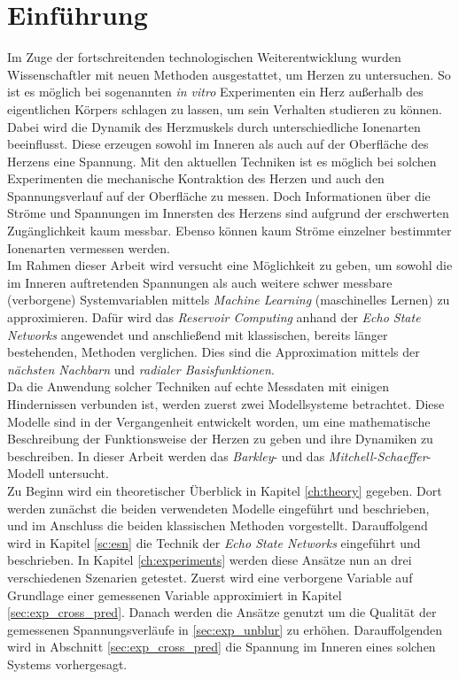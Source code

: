 \chapter{Einführung}



Im Zuge der fortschreitenden technologischen Weiterentwicklung wurden Wissenschaftler mit neuen Methoden ausgestattet, um Herzen zu untersuchen. So ist es möglich bei sogenannten \textit{in vitro} Experimenten ein Herz außerhalb des eigentlichen Körpers schlagen zu lassen, um sein Verhalten studieren zu können. Dabei wird die Dynamik des Herzmuskels durch unterschiedliche Ionenarten beeinflusst. Diese erzeugen sowohl im Inneren als auch auf der Oberfläche des Herzens eine Spannung. Mit den aktuellen Techniken ist es möglich bei solchen Experimenten die mechanische Kontraktion des Herzen und auch den Spannungsverlauf auf der Oberfläche zu messen. Doch Informationen über die Ströme und Spannungen im Innersten des Herzens sind aufgrund der erschwerten Zugänglichkeit kaum messbar. Ebenso können kaum Ströme einzelner bestimmter Ionenarten vermessen werden. \\

Im Rahmen dieser Arbeit wird versucht eine Möglichkeit zu geben, um sowohl die im Inneren auftretenden Spannungen als auch weitere schwer messbare (verborgene) Systemvariablen mittels \textit{Machine Learning} (maschinelles Lernen) zu approximieren. Dafür wird das \textit{Reservoir Computing} anhand der \textit{Echo State Networks} angewendet und anschließend mit klassischen, bereits länger bestehenden, Methoden verglichen. Dies sind die Approximation mittels der \textit{nächsten Nachbarn} und \textit{radialer Basisfunktionen}.\\
  
Da die Anwendung solcher Techniken auf echte Messdaten mit einigen Hindernissen verbunden ist, werden zuerst zwei Modellsysteme betrachtet. Diese Modelle sind in der Vergangenheit entwickelt worden, um eine mathematische Beschreibung der Funktionsweise der Herzen zu geben und ihre Dynamiken zu beschreiben. In dieser Arbeit werden das \textit{Barkley}- und das \textit{Mitchell-Schaeffer}-Modell untersucht. \\

Zu Beginn wird ein theoretischer Überblick in Kapitel \ref{ch:theory} gegeben. Dort werden zunächst die beiden verwendeten Modelle eingeführt und beschrieben, und im Anschluss die beiden klassischen Methoden vorgestellt. Darauffolgend wird in Kapitel \ref{sc:esn} die Technik der \textit{Echo State Networks} eingeführt und beschrieben. In Kapitel \ref{ch:experiments} werden diese Ansätze nun an drei verschiedenen Szenarien getestet. Zuerst wird eine verborgene Variable auf Grundlage einer gemessenen Variable approximiert in Kapitel \ref{sec:exp_cross_pred}. Danach werden die Ansätze genutzt um die Qualität der gemessenen Spannungsverläufe in \ref{sec:exp_unblur} zu erhöhen. Darauffolgenden wird in Abschnitt \ref{sec:exp_cross_pred} die Spannung im Inneren eines solchen Systems vorhergesagt.\\

